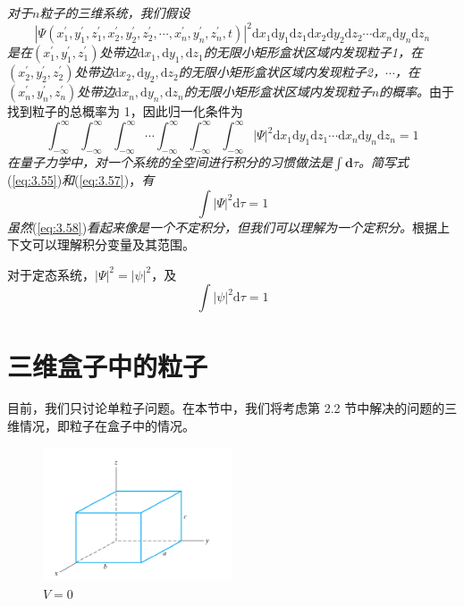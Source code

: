 	\textit{对于$n$粒子的三维系统，我们假设}
	\begin{equation}
		\boxed{
			\left|\Psi\left(x_1^{\prime}, y_1^{\prime}, z_1^{\prime},x_2^{\prime}, y_2^{\prime}, z_2^{\prime},\cdots,x_n^{\prime}, y_n^{\prime}, z_n^{\prime},t\right)\right|^2 \mathrm{d}x_1\mathrm{d}y_1\mathrm{d}z_1\mathrm{d}x_2\mathrm{d}y_2\mathrm{d}z_2\cdots\mathrm{d}x_n\mathrm{d}y_n\mathrm{d}z_n
		}
		\label{eq:3.56}
	\end{equation}
	\textit{是在$\left(x_1^{\prime},y_1^{\prime},z_1^{\prime}\right)$处带边$\mathrm{d}x_1,\mathrm{d}y_1,\mathrm{d}z_1$的无限小矩形盒状区域内发现粒子1，在$\left(x_2^{\prime},y_2^{\prime},z_2^{\prime}\right)$处带边$\mathrm{d}x_2,\mathrm{d}y_2,\mathrm{d}z_2$的无限小矩形盒状区域内发现粒子2，$\cdots$，在$\left(x_n^{\prime},y_n^{\prime},z_n^{\prime}\right)$处带边$\mathrm{d}x_n,\mathrm{d}y_n,\mathrm{d}z_n$的无限小矩形盒状区域内发现粒子$n$的概率。}由于找到粒子的总概率为 1，因此归一化条件为
	\begin{equation}
		\int_{-\infty}^{\infty}\int_{-\infty}^{\infty}\int_{-\infty}^{\infty}\cdots\int_{-\infty}^{\infty}\int_{-\infty}^{\infty}\int_{-\infty}^{\infty}\left|\Psi\right|^2 \mathrm{d}x_1\mathrm{d}y_1\mathrm{d}z_1\cdots\mathrm{d}x_n\mathrm{d}y_n\mathrm{d}z_n = 1
		\label{eq:3.57}
	\end{equation}
	\textit{在量子力学中，对一个系统的全空间进行积分的习惯做法是$\int\mathbf{d}\tau$。简写式}(\ref{eq:3.55})\textit{和}(\ref{eq:3.57})，\textit{有}
	\begin{equation}
		\boxed{
			\int\left|\Psi\right|^2\mathrm{d}\tau = 1
		}
		\label{eq:3.58}
	\end{equation}
	\textit{虽然}(\ref{eq:3.58})\textit{看起来像是一个不定积分，但我们可以理解为一个定积分。}根据上下文可以理解积分变量及其范围。

	对于定态系统，$\left|\Psi\right|^2 = \left|\psi\right|^2$，及
	\begin{equation}
		\boxed{
			\int\left|\psi\right|^2\mathrm{d}\tau = 1
		}
		\label{eq:3.59}
	\end{equation}
	
\section{三维盒子中的粒子}
\label{sec:3.5 The Particle in a Three-Dimensional Box}
	目前，我们只讨论单粒子问题。在本节中，我们将考虑第 2.2 节中解决的问题的三维情况，即粒子在盒子中的情况。\\
	\begin{figure}[h!]
		\centering
		\includegraphics[width=0.5\textwidth]{Figures/3.2.png}  %
		\caption{$V=0$}
		\label{fig:3.2}
	\end{figure}

